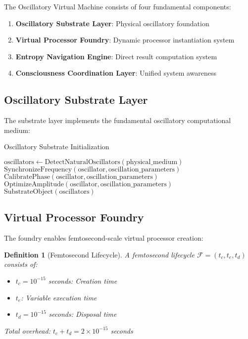 \documentclass[12pt,a4paper]{article}
\newtheorem{definition}{Definition}
\begin{document}
The Oscillatory Virtual Machine consists of four fundamental components:

\begin{enumerate}
\item \textbf{Oscillatory Substrate Layer}: Physical oscillatory foundation
\item \textbf{Virtual Processor Foundry}: Dynamic processor instantiation system
\item \textbf{Entropy Navigation Engine}: Direct result computation system
\item \textbf{Consciousness Coordination Layer}: Unified system awareness
\end{enumerate}

\subsection{Oscillatory Substrate Layer}

The substrate layer implements the fundamental oscillatory computational medium:

\begin{algorithm}
\caption{Oscillatory Substrate Initialization}
\begin{algorithmic}[1]
    \State $\text{oscillators} \leftarrow \text{DetectNaturalOscillators}(\text{physical\_medium})$
        \State $\text{SynchronizeFrequency}(\text{oscillator}, \text{oscillation\_parameters})$
        \State $\text{CalibratePhase}(\text{oscillator}, \text{oscillation\_parameters})$
        \State $\text{OptimizeAmplitude}(\text{oscillator}, \text{oscillation\_parameters})$
    \EndFor
    \State \Return $\text{SubstrateObject}(\text{oscillators})$
\EndProcedure
\end{algorithmic}
\end{algorithm}

\subsection{Virtual Processor Foundry}

The foundry enables femtosecond-scale virtual processor creation:

\begin{definition}[Femtosecond Lifecycle]
A femtosecond lifecycle $\mathcal{F} = (t_c, t_e, t_d)$ consists of:
\begin{itemize}
\item $t_c = 10^{-15}$ seconds: Creation time
\item $t_e$: Variable execution time
\item $t_d = 10^{-15}$ seconds: Disposal time
\end{itemize}
Total overhead: $t_c + t_d = 2 \times 10^{-15}$ seconds
\end{definition}
\end{document}
